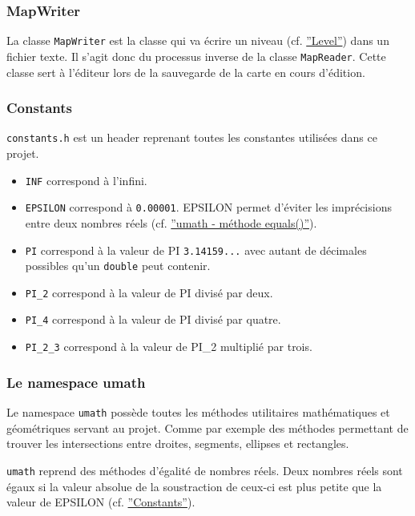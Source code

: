 \documentclass[]{article}
\begin{document}
\subsubsection{MapWriter}

La classe \texttt{MapWriter} est la classe qui va écrire un niveau (cf. \hyperref[Level]{''Level''}) 
dans un fichier texte. Il s’agit donc du processus inverse de la classe
\texttt{MapReader}. Cette classe sert à l’éditeur lors de la sauvegarde de la
carte en cours d’édition.

\subsubsection{\label{Constants}Constants}

\texttt{constants.h} est un header reprenant toutes les constantes utilisées
dans ce projet. 

\begin{itemize}
    \item \texttt{INF} correspond à l'infini.
    \item \texttt{EPSILON} correspond à \texttt{0.00001}. EPSILON permet
        d'éviter les imprécisions entre deux nombres réels (cf. \hyperref[equals]{''umath - méthode equals()''}).
    \item \texttt{PI} correspond à la valeur de PI \texttt{3.14159...} avec
        autant de décimales possibles qu'un \texttt{double} peut contenir.
    \item \texttt{PI\_2} correspond à la valeur de PI divisé par deux.
    \item \texttt{PI\_4} correspond à la valeur de PI divisé par quatre.
    \item \texttt{PI\_2\_3} correspond à la valeur de PI\_2 multiplié par trois.
\end{itemize}

\subsubsection{Le namespace umath}

Le namespace \texttt{umath} possède toutes les méthodes utilitaires mathématiques
et géométriques servant au projet. Comme par exemple des méthodes permettant de trouver
les intersections entre droites, segments, ellipses et rectangles.

\label{equals}
\texttt{umath} reprend des méthodes d'égalité de nombres réels. Deux nombres réels sont égaux
si la valeur absolue de la soustraction de ceux-ci est plus petite que la valeur de EPSILON (cf. \hyperref[Constants]{''Constants''}).
\end{document}
